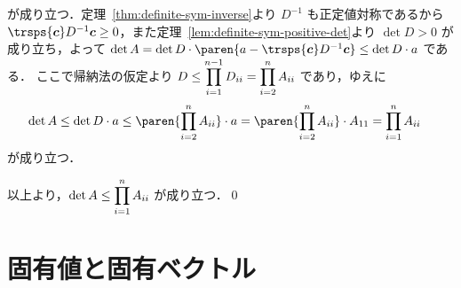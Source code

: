 \documentclass[a4paper]{jsarticle}
\begin{document}
{\begin{itemize}
        が成り立つ．定理~\ref{thm:definite-sym-inverse}より $D^{-1}$ も正定値対称であるから
        $\trsps{\vecc} D^{-1} \vecc \geq 0$，また定理~\ref{lem:definite-sym-positive-det}より $\det D > 0$ が成り立ち，よって
        $\det A = \det D \cdot \paren{a - \trsps{\vecc} D^{-1} \vecc} \leq \det D \cdot a$ である．
        ここで帰納法の仮定より $\displaystyle D \leq \prod_{i = 1}^{n - 1} D_{i i} = \prod_{i = 2}^{n} A_{i i}$ であり，ゆえに
        \begin{align*}
          \det A
          \leq \det D \cdot a
          \leq \paren{\prod_{i = 2}^{n} A_{i i}} \cdot a
          &= \paren{\prod_{i = 2}^{n} A_{i i}} \cdot A_{1 1}
          = \prod_{i = 1}^{n} A_{i i}
        \end{align*}
        が成り立つ．
      \end{itemize}
      以上より，$\displaystyle \det A \leq \prod_{i = 1}^{n} A_{i i}$ が成り立つ．\qed
    }
\section{固有値と固有ベクトル}
\end{document}
